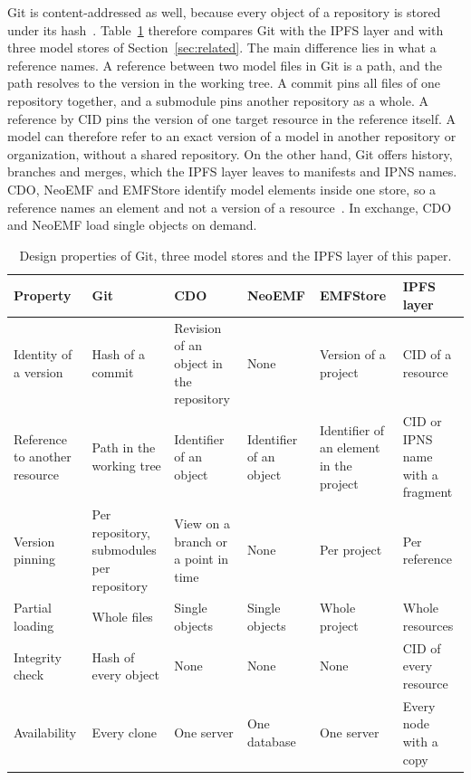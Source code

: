 \documentclass[5p,times,twocolumn]{elsarticle}
\theoremstyle{definition}
\theoremstyle{plain}
\begin{document}
Git is content-addressed as well, because every object of a repository is stored under its hash~\cite{chacon2014progit}. Table~\ref{tab:comparison} therefore compares Git with the IPFS layer and with three model stores of Section~\ref{sec:related}. The main difference lies in what a reference names. A reference between two model files in Git is a path, and the path resolves to the version in the working tree. A commit pins all files of one repository together, and a submodule pins another repository as a whole. A reference by CID pins the version of one target resource in the reference itself. A model can therefore refer to an exact version of a model in another repository or organization, without a shared repository. On the other hand, Git offers history, branches and merges, which the IPFS layer leaves to manifests and IPNS names. CDO, NeoEMF and EMFStore identify model elements inside one store, so a reference names an element and not a version of a resource~\cite{cdo,daniel2017neoemf,koegel2010emfstore}. In exchange, CDO and NeoEMF load single objects on demand.

\begin{table}[t]
\caption{Design properties of Git, three model stores and the IPFS layer of this paper.}\label{tab:comparison}
\begin{tabular*}{\textwidth}{@{\extracolsep\fill}p{}p{}p{}p{}p{}p{}@{}}
\toprule
Property & Git & CDO & NeoEMF & EMFStore & IPFS layer \\
\midrule
Identity of a version & Hash of a commit & Revision of an object in the repository & None & Version of a project & CID of a resource \\
Reference to another resource & Path in the working tree & Identifier of an object & Identifier of an object & Identifier of an element in the project & CID or IPNS name with a fragment \\
Version pinning & Per repository, submodules per repository & View on a branch or a point in time & None & Per project & Per reference \\
Partial loading & Whole files & Single objects & Single objects & Whole project & Whole resources \\
Integrity check & Hash of every object & None & None & None & CID of every resource \\
Availability & Every clone & One server & One database & One server & Every node with a copy \\
\bottomrule
\end{tabular*}
\end{table}
\end{document}
